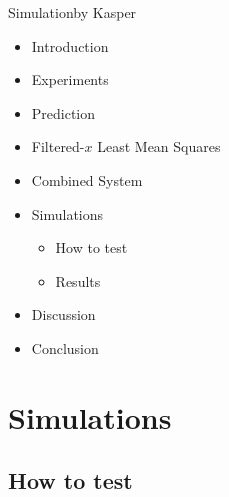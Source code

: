 

\begin{frame}{Simulation}{by Kasper}
	\begin{itemize}
		\item[] Introduction
		\item[] Experiments
		\item[] Prediction
		\item[] Filtered-$x$ Least Mean Squares
		\item[] Combined System
		\item[] \textcolor{beamer@headercolor}{Simulations}
		\begin{itemize}
			\item[] \textcolor{beamer@headercolor}{How to test}
			\item[] \textcolor{beamer@headercolor}{Results}
		\end{itemize}
		\item[] \textcolor{beamer@headercolor}{Discussion}
		\item[] \textcolor{beamer@headercolor}{Conclusion}
	\end{itemize}
\end{frame}


\section{Simulations}
\subsection{How to test}

